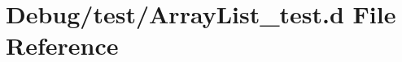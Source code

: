 \hypertarget{_array_list__test_8d}{}\section{Debug/test/\+Array\+List\+\_\+test.d File Reference}
\label{_array_list__test_8d}

